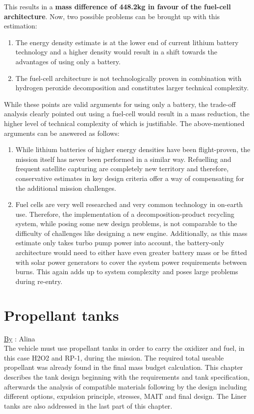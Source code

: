 This results in a \textbf{mass difference of 448.2kg in favour of the fuel-cell architecture}. Now, two possible problems can be brought up with this estimation:
\begin{enumerate}
	\item	The energy density estimate is at the lower end of current lithium battery technology and a higher density would result in a shift towards the advantages of using only a battery.
	\item	The fuel-cell architecture is not technologically proven in combination with hydrogen peroxide decomposition and constitutes larger technical complexity.
\end{enumerate}

While these points are valid arguments for using only a battery, the trade-off analysis clearly pointed out using a fuel-cell would result in a mass reduction, the higher level of technical complexity of which is justifiable. The above-mentioned arguments can be answered as follows:
\begin{enumerate}
	\item	While lithium batteries of higher energy densities have been flight-proven, the mission itself has never been performed in a similar way. Refuelling and frequent satellite capturing are completely new territory and therefore, conservative estimates in key design criteria offer a way of compensating for the additional mission challenges.
	\item	Fuel cells are very well researched and very common technology in on-earth use. Therefore, the implementation of a decomposition-product recycling system, while posing some new design problems, is not comparable to the difficulty of challenges like designing a new engine. Additionally, as this mass estimate only takes turbo pump power into account, the battery-only architecture would need to either have even greater battery mass or be fitted with solar power generators to cover the system power requirements between burns. This again adds up to system complexity and poses large problems during re-entry.
	
\end{enumerate}
\section{Propellant tanks}
\qquad \underline{By} : Alina\\

The vehicle must use propellant tanks in order to carry the oxidizer and fuel, in this case H2O2 and RP-1, during the mission. The required total useable propellant was already found in the final mass budget calculation. 
This chapter describes the tank design beginning with the requirements and tank specification, afterwards the analysis of compatible materials following by the design including different options, expulsion principle, stresses, MAIT and final design. The Liner tanks are also addressed in the last part of this chapter.\\


